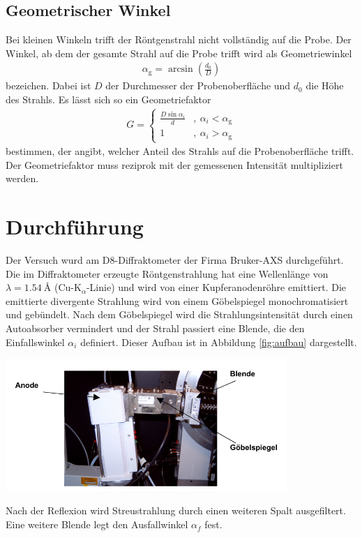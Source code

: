 \documentclass[captions=tableheading]{scrartcl}
\newcommand{\indx}[1]{\text{#1}}
\begin{document}
\subsection{Geometrischer Winkel}
Bei kleinen Winkeln trifft der Röntgenstrahl nicht vollständig auf die Probe. Der Winkel, ab dem der gesamte Strahl auf die Probe trifft wird als Geometriewinkel 
\begin{align}
\alpha_{\indx{g}}=\arcsin \left( \frac{d_0}{D} \right)
\end{align}
bezeichen. 
Dabei ist $D$ der Durchmesser der Probenoberfläche und $d_0$ die Höhe des Strahls.
Es lässt sich so ein Geometriefaktor 
\begin{align}
G=\left\lbrace\begin{matrix}
\frac{D \sin \alpha_{i} }{d} &,\ \alpha_{i} < \alpha_{\indx{g}} \\
1 &,\  \alpha_{i} > \alpha_{\indx{g}}
\end{matrix}\right.
\label{eq:geometriefaktor}
\end{align}
bestimmen, der angibt, welcher Anteil des Strahls auf die Probenoberfläche trifft.
Der Geometriefaktor muss reziprok mit der gemessenen Intensität multipliziert werden.

\section{Durchführung}
Der Versuch wurd am D8-Diffraktometer der Firma Bruker-AXS durchgeführt. Die im Diffraktometer erzeugte Röntgenstrahlung hat eine Wellenlänge von $\lambda=\SI{1.54}{\angstrom}$ (Cu-K$_{\alpha}$-Linie) und wird von einer Kupferanodenröhre emittiert. Die emittierte divergente Strahlung wird von einem Göbelspiegel monochromatisiert und gebündelt. Nach dem Göbelspiegel wird die Strahlungsintensität durch einen Autoabsorber vermindert und der Strahl passiert eine Blende, die den Einfallswinkel $\alpha_i$ definiert. Dieser Aufbau ist in Abbildung \ref{fig:aufbau} dargestellt.
\begin{center}
	\includegraphics[width=0.8\textwidth]{images/aufbau.png}
	\label{fig:aufbau}
\end{center}
Nach der Reflexion wird Streustrahlung durch einen weiteren Spalt ausgefiltert. Eine weitere Blende legt den Ausfallwinkel $\alpha_f$ fest. \\
\end{document}

